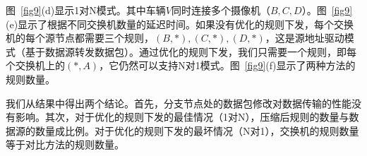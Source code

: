\documentclass{ctexart}
\begin{document}
图~\ref{fig9}(d)显示1对N模式。其中车辆$V$同时连接多个摄像机（$B, C, D$）。图~\ref{fig9}(e)显示了根据不同交换机数量的延迟时间。如果没有优化的规则下发，每个交换机的每个源节点都需要三个规则，$(B, *), (C, *), (D, *)$，这是源地址驱动模式（基于数据源转发数据包）。通过优化的规则下发，我们只需要一个规则，即每个交换机上的$(*, A)$，它仍然可以支持N对1模式。图~\ref{fig9}(f)显示了两种方法的规则数量。



我们从结果中得出两个结论。首先，分支节点处的数据包修改对数据传输的性能没有影响。其次，对于优化的规则下发的最佳情况（1对N），压缩后规则的数量与数据源的数量成比例。对于优化的规则下发的最坏情况（N对1），交换机的规则数量等于对比方法的规则数量。


\end{document}
